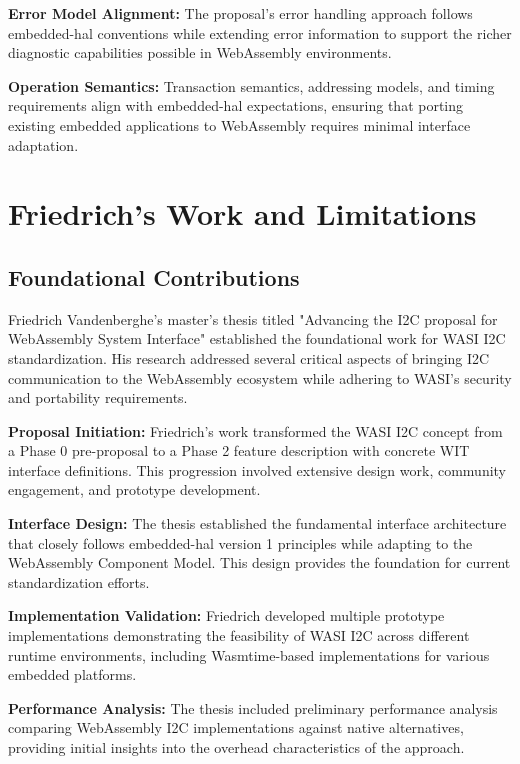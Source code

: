 \textbf{Error Model Alignment:} The proposal's error handling approach follows embedded-hal conventions while extending error information to support the richer diagnostic capabilities possible in WebAssembly environments.

\textbf{Operation Semantics:} Transaction semantics, addressing models, and timing requirements align with embedded-hal expectations, ensuring that porting existing embedded applications to WebAssembly requires minimal interface adaptation.

\section{Friedrich's Work and Limitations}
\label{sec:friedrich-work}

\subsection{Foundational Contributions}
\label{subsec:friedrich-contributions}

Friedrich Vandenberghe's master's thesis titled "Advancing the I2C proposal for WebAssembly System Interface" established the foundational work for WASI I2C standardization\cite{friedrich_thesis}. His research addressed several critical aspects of bringing I2C communication to the WebAssembly ecosystem while adhering to WASI's security and portability requirements.

\textbf{Proposal Initiation:} Friedrich's work transformed the WASI I2C concept from a Phase 0 pre-proposal to a Phase 2 feature description with concrete WIT interface definitions. This progression involved extensive design work, community engagement, and prototype development.

\textbf{Interface Design:} The thesis established the fundamental interface architecture that closely follows embedded-hal version 1 principles while adapting to the WebAssembly Component Model. This design provides the foundation for current standardization efforts.

\textbf{Implementation Validation:} Friedrich developed multiple prototype implementations demonstrating the feasibility of WASI I2C across different runtime environments, including Wasmtime-based implementations for various embedded platforms.

\textbf{Performance Analysis:} The thesis included preliminary performance analysis comparing WebAssembly I2C implementations against native alternatives, providing initial insights into the overhead characteristics of the approach.

